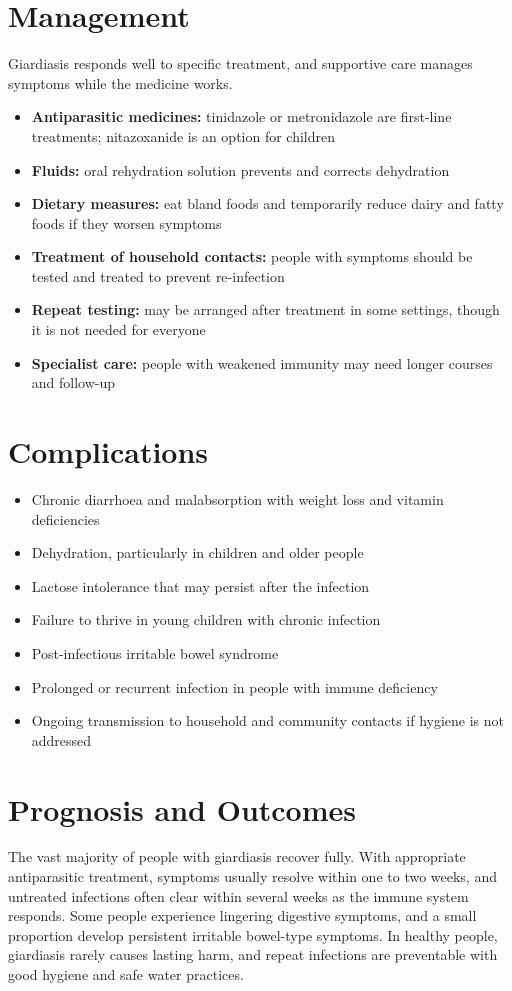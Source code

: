 \section*{Management}
Giardiasis responds well to specific treatment, and supportive care manages symptoms while the medicine works.

\begin{itemize}
    \item \textbf{Antiparasitic medicines:} tinidazole or metronidazole are first-line treatments; nitazoxanide is an option for children
    \item \textbf{Fluids:} oral rehydration solution prevents and corrects dehydration
    \item \textbf{Dietary measures:} eat bland foods and temporarily reduce dairy and fatty foods if they worsen symptoms
    \item \textbf{Treatment of household contacts:} people with symptoms should be tested and treated to prevent re-infection
    \item \textbf{Repeat testing:} may be arranged after treatment in some settings, though it is not needed for everyone
    \item \textbf{Specialist care:} people with weakened immunity may need longer courses and follow-up
\end{itemize}

\section*{Complications}
\begin{itemize}
    \item Chronic diarrhoea and malabsorption with weight loss and vitamin deficiencies
    \item Dehydration, particularly in children and older people
    \item Lactose intolerance that may persist after the infection
    \item Failure to thrive in young children with chronic infection
    \item Post-infectious irritable bowel syndrome
    \item Prolonged or recurrent infection in people with immune deficiency
    \item Ongoing transmission to household and community contacts if hygiene is not addressed
\end{itemize}

\section*{Prognosis and Outcomes}
The vast majority of people with giardiasis recover fully. With appropriate antiparasitic treatment, symptoms usually resolve within one to two weeks, and untreated infections often clear within several weeks as the immune system responds. Some people experience lingering digestive symptoms, and a small proportion develop persistent irritable bowel-type symptoms. In healthy people, giardiasis rarely causes lasting harm, and repeat infections are preventable with good hygiene and safe water practices.

